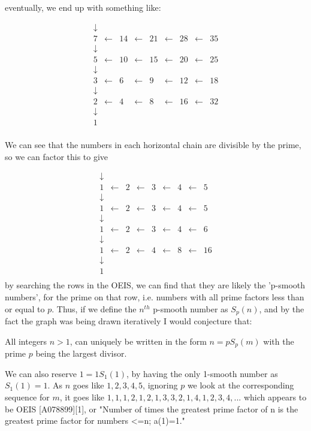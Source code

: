 \documentclass{article}
\begin{document}
eventually, we end up with something like:

$$
\begin{matrix}
\downarrow \\
7 &\leftarrow &14 &\leftarrow &21 &\leftarrow &28 &\leftarrow &35 \\
\downarrow \\
5 &\leftarrow &10 &\leftarrow &15 &\leftarrow &20 &\leftarrow &25 \\
\downarrow \\
3 &\leftarrow &6 &\leftarrow &9 &\leftarrow &12 &\leftarrow &18 \\
\downarrow \\
2 &\leftarrow &4 &\leftarrow &8 &\leftarrow &16 &\leftarrow &32 \\
\downarrow \\
1  \\
\end{matrix}
$$

We can see that the numbers in each horizontal chain are divisible by the prime, so we can factor this to give

$$
\begin{matrix}
\downarrow \\
1 &\leftarrow &2 &\leftarrow &3 &\leftarrow &4 &\leftarrow &5 \\
\downarrow \\
1 &\leftarrow &2 &\leftarrow &3 &\leftarrow &4 &\leftarrow &5 \\
\downarrow \\
1 &\leftarrow &2 &\leftarrow &3 &\leftarrow &4 &\leftarrow &6 \\
\downarrow \\
1 &\leftarrow &2 &\leftarrow &4 &\leftarrow &8 &\leftarrow &16 \\
\downarrow \\
1  \\
\end{matrix}
$$
by searching the rows in the OEIS, we can find that they are likely the 'p-smooth numbers', for the prime on that row, i.e. numbers with all prime factors less than or equal to $p$. Thus, if we define the $n^{th}$ p-smooth number as $S_p(n)$, and by the fact the graph was being drawn iteratively I would conjecture that: 

All integers $n>1$, can uniquely be written in the form $n=p S_p(m)$ with the prime $p$ being the largest divisor. 

We can also reserve $1 = 1 S_1(1)$, by having the only 1-smooth number as $S_1(1)=1$. As $n$ goes like $1,2,3,4,5$, ignoring $p$ we look at the corresponding sequence for $m$, it goes like $	1, 1, 1, 2, 1, 2, 1, 3, 3, 2, 1, 4, 1, 2, 3, 4,...$ which appears to be OEIS [A078899][1], or "Number of times the greatest prime factor of n is the greatest prime factor for numbers <=n; a(1)=1."
\end{document}
